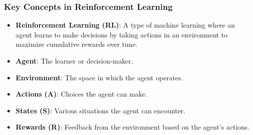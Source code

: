 \documentclass[aspectratio=169]{beamer}
\begin{document}
\begin{frame}[fragile]
    \frametitle{Key Concepts in Reinforcement Learning}
    \begin{itemize}
        \item \textbf{Reinforcement Learning (RL)}: A type of machine learning where an agent learns to make decisions by taking actions in an environment to maximize cumulative rewards over time.
        \item \textbf{Agent}: The learner or decision-maker.
        \item \textbf{Environment}: The space in which the agent operates.
        \item \textbf{Actions (A)}: Choices the agent can make.
        \item \textbf{States (S)}: Various situations the agent can encounter.
        \item \textbf{Rewards (R)}: Feedback from the environment based on the agent’s actions.
    \end{itemize}
\end{frame}
\end{document}
